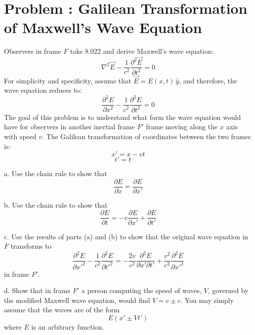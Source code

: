 \documentclass[problems]{esg8022pset}
\begin{document}
\section{Problem \thesection: Galilean Transformation of Maxwell's Wave Equation}

Observers in frame $F$ take 8.022 and derive Maxwell's wave equation:
$$\nabla^2\vec{E} - \frac{1}{c^2} \frac{\partial^2\vec{E}}{\partial t^2} = 0$$
For simplicity and specificity, assume that $\vec{E} = E(x,t)\, \hat{y}$, and therefore, the wave equation reduces to:
$$\frac{\partial^2E}{\partial x^2} - \frac{1}{c^2} \frac{\partial^2E}{\partial t^2} = 0$$
The goal of this problem is to understand what form the wave equation would have for observers in another inertial frame $F'$ frame moving along the $x$ axis with speed $v$.  The Galilean transformation of coordinates between the two frames is:
$$x' = x - vt$$
$$t' = t~~~~~~~$$


\noindent
a. Use the chain rule to show that
$$\frac{\partial E}{\partial x} = \frac{\partial E}{\partial x'}$$


\noindent
b. Use the chain rule to show that
$$\frac{\partial E}{\partial t} = -v \frac{\partial E}{\partial x'} + \frac{\partial E}{\partial t'}$$


\noindent
c. Use the results of parts (a) and (b) to show that the original wave equation in $F$ transforms to
$$\frac{\partial^2E}{\partial x'^2} - \frac{1}{c^2} \frac{\partial^2E}{\partial t'^2} = -\frac{2v}{c^2} \frac{\partial^2E}{\partial x' \partial t'} + \frac{v^2}{c^2} \frac{\partial^2E}{\partial x'^2}$$
in frame $F'$.


\noindent
d. Show that in frame $F'$ a person computing the speed of waves, $V$, governed by the modified Maxwell wave equation, would find $V = v \pm c$.  You may simply assume that the waves are of the form
$$E(x' \pm Vt')$$
where $E$ is an arbitrary function.
\end{document}
